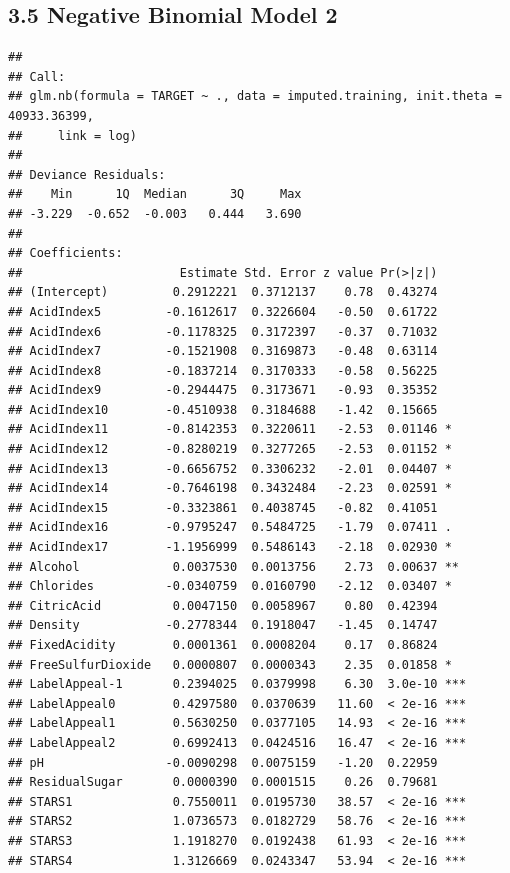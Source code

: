 \documentclass[]{article}
\begin{document}
\hypertarget{negative-binomial-model-2}{%
\subsection{3.5 Negative Binomial Model
2}\label{negative-binomial-model-2}}

\begin{verbatim}
## 
## Call:
## glm.nb(formula = TARGET ~ ., data = imputed.training, init.theta = 40933.36399, 
##     link = log)
## 
## Deviance Residuals: 
##    Min      1Q  Median      3Q     Max  
## -3.229  -0.652  -0.003   0.444   3.690  
## 
## Coefficients:
##                      Estimate Std. Error z value Pr(>|z|)    
## (Intercept)         0.2912221  0.3712137    0.78  0.43274    
## AcidIndex5         -0.1612617  0.3226604   -0.50  0.61722    
## AcidIndex6         -0.1178325  0.3172397   -0.37  0.71032    
## AcidIndex7         -0.1521908  0.3169873   -0.48  0.63114    
## AcidIndex8         -0.1837214  0.3170333   -0.58  0.56225    
## AcidIndex9         -0.2944475  0.3173671   -0.93  0.35352    
## AcidIndex10        -0.4510938  0.3184688   -1.42  0.15665    
## AcidIndex11        -0.8142353  0.3220611   -2.53  0.01146 *  
## AcidIndex12        -0.8280219  0.3277265   -2.53  0.01152 *  
## AcidIndex13        -0.6656752  0.3306232   -2.01  0.04407 *  
## AcidIndex14        -0.7646198  0.3432484   -2.23  0.02591 *  
## AcidIndex15        -0.3323861  0.4038745   -0.82  0.41051    
## AcidIndex16        -0.9795247  0.5484725   -1.79  0.07411 .  
## AcidIndex17        -1.1956999  0.5486143   -2.18  0.02930 *  
## Alcohol             0.0037530  0.0013756    2.73  0.00637 ** 
## Chlorides          -0.0340759  0.0160790   -2.12  0.03407 *  
## CitricAcid          0.0047150  0.0058967    0.80  0.42394    
## Density            -0.2778344  0.1918047   -1.45  0.14747    
## FixedAcidity        0.0001361  0.0008204    0.17  0.86824    
## FreeSulfurDioxide   0.0000807  0.0000343    2.35  0.01858 *  
## LabelAppeal-1       0.2394025  0.0379998    6.30  3.0e-10 ***
## LabelAppeal0        0.4297580  0.0370639   11.60  < 2e-16 ***
## LabelAppeal1        0.5630250  0.0377105   14.93  < 2e-16 ***
## LabelAppeal2        0.6992413  0.0424516   16.47  < 2e-16 ***
## pH                 -0.0090298  0.0075159   -1.20  0.22959    
## ResidualSugar       0.0000390  0.0001515    0.26  0.79681    
## STARS1              0.7550011  0.0195730   38.57  < 2e-16 ***
## STARS2              1.0736573  0.0182729   58.76  < 2e-16 ***
## STARS3              1.1918270  0.0192438   61.93  < 2e-16 ***
## STARS4              1.3126669  0.0243347   53.94  < 2e-16 ***

\end{verbatim}
\end{document}
